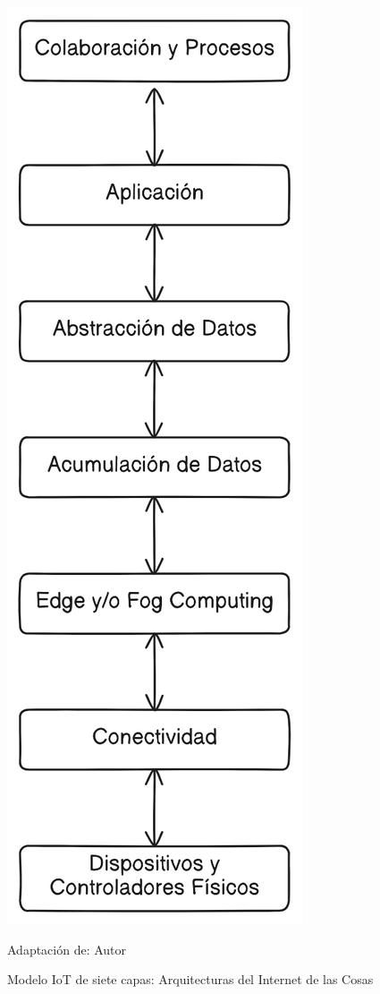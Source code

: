 \documentclass[stu,12pt,floatsintext]{apa7}
\begin{document}
		\begin{figure}[H]
		\centering
		\includegraphics[scale=0.3]{iot_modelo_7_capas}
		\captionsetup{justification=centering}
		\caption{Modelo IoT de siete capas: Arquitecturas del Internet de las Cosas}
		\small
		\label{iot_siete_capas}
		Adaptación de: Autor
	\end{figure}
	
\end{document}
